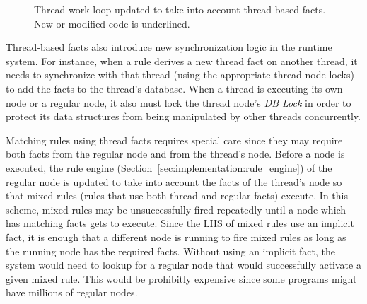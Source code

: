 \begin{figure}
\begin{algorithm}[H]
\end{algorithm}
\caption{Thread work loop updated to take into account thread-based facts.
New or modified code is underlined.}
\label{alg:threads:work_loop}
\end{figure}

Thread-based facts also introduce new synchronization logic in the runtime
system. For instance, when a rule derives a new thread fact on another thread,
it needs to synchronize with that thread (using the appropriate thread node
locks) to add the facts to the thread's database. When a thread is executing its
own node or a regular node, it also must lock the thread node's \emph{DB Lock}
in order to protect its data structures from being manipulated by other threads
concurrently.

Matching rules using thread facts requires special care since they may require
both facts from the regular node and from the thread's node. Before a node is
executed, the rule engine (Section~\ref{sec:implementation:rule_engine}) of the
regular node is updated to take into account the facts of the thread's node so
that mixed rules (rules that use both thread and regular facts) execute. In this
scheme, mixed rules may be unsuccessfully fired repeatedly until a node which
has matching facts gets to execute. Since the LHS of mixed rules use an implicit
 fact, it is enough that a different node is running
to fire mixed rules as long as the running node has the required facts.
Without using an implicit  fact, the system would need to lookup
for a regular node that would successfully activate a given mixed rule. This
would be prohibitly expensive since some programs might have millions of regular
nodes.
